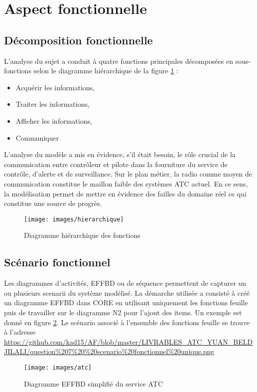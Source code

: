 \section{Aspect fonctionnelle}
	
	\subsection{Décomposition fonctionnelle}
	
	L'analyse du sujet a conduit à quatre fonctions principales décomposées en sous-fonctions selon le diagramme hiérarchique de la figure \ref{hier} :
	
	\begin{itemize}
		\item Acquérir les informations, 
		\item Traiter les informations,
		\item Afficher les informations,
		\item Communiquer
	\end{itemize}

L'analyse du modèle a mis en évidence, s'il était besoin, le rôle crucial
de la communication entre contrôleur et pilote dans la fourniture du service de contrôle, d'alerte et de surveillance. Sur le plan métier, la radio comme moyen de communication constitue le maillon faible des systèmes ATC actuel. En ce sens, la modélisation permet 
de mettre en évidence des failles du domaine réel ce qui constitue une source de progrès. 
	
	\begin{figure}[H]
		\begin{center}	
			\texttt{[image: images/hierarchique]}
			\caption{Diagramme hiérarchique des fonctions}
			\label{hier}
		\end{center}
	\end{figure}
	
	\subsection{Scénario fonctionnel}

    Les diagrammes d'activités, EFFBD ou de séquence permettent de capturer un ou plusieurs scenarii du système modélisé. La démarche utilisée a consisté à créé un diagramme EFFBD dans CORE en utilisant uniquement les fonctions feuille puis de travailler sur le diagramme N2 pour l'ajout des items. Un exemple est donné en figure \ref{atc}. Le scénario associé à l'ensemble des fonctions feuille se trouve à l'adresse  \url{https://github.com/kad15/AF/blob/master/LIVRABLES_ATC_YUAN_BELDJILALI/question%207%20%20scenario%20fonctionnel%20unique.png}
    
    	\begin{figure}[H]
    	\begin{center}	
    		\texttt{[image: images/atc]}
    		\caption{Diagramme EFFBD simplifié du service ATC}
    		\label{atc}
    	\end{center}
    \end{figure}
    